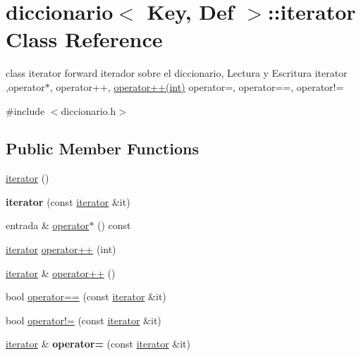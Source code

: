 \hypertarget{classdiccionario_1_1iterator}{\section{diccionario$<$ Key, Def $>$\-:\-:iterator Class Reference}
\label{classdiccionario_1_1iterator}
}


class iterator forward iterador sobre el diccionario, Lectura y Escritura iterator ,operator$\ast$, operator++, \hyperlink{classdiccionario_1_1iterator_a64f78428635fb5d522c3fb74c620a730}{operator++(int)} operator=, operator==, operator!=  




{\ttfamily \#include $<$diccionario.\-h$>$}

\subsection*{Public Member Functions}
\begin{DoxyCompactItemize}
\item 
\hyperlink{classdiccionario_1_1iterator_adee4d56d4dab49ac2447e756bfccb8bc}{iterator} ()
\item 
\hypertarget{classdiccionario_1_1iterator_aee562a07b03b74b21fb053fc1ef5e7d3}{{\bfseries iterator} (const \hyperlink{classdiccionario_1_1iterator}{iterator} \&it)}\label{classdiccionario_1_1iterator_aee562a07b03b74b21fb053fc1ef5e7d3}

\item 
entrada \& \hyperlink{classdiccionario_1_1iterator_a8da6c31c0d71de2858b866f8ba821046}{operator$\ast$} () const 
\item 
\hyperlink{classdiccionario_1_1iterator}{iterator} \hyperlink{classdiccionario_1_1iterator_a64f78428635fb5d522c3fb74c620a730}{operator++} (int)
\item 
\hyperlink{classdiccionario_1_1iterator}{iterator} \& \hyperlink{classdiccionario_1_1iterator_a94163f319041c0b014c60f93af51d14d}{operator++} ()
\item 
bool \hyperlink{classdiccionario_1_1iterator_a19ee50ed9600a52098814dbe7ad0cf33}{operator==} (const \hyperlink{classdiccionario_1_1iterator}{iterator} \&it)
\item 
bool \hyperlink{classdiccionario_1_1iterator_a6a6cf53a336bdec1a8ab55850d3b5a71}{operator!=} (const \hyperlink{classdiccionario_1_1iterator}{iterator} \&it)
\item 
\hypertarget{classdiccionario_1_1iterator_ae92cc5747c6b0807885de2b6f5053a59}{\hyperlink{classdiccionario_1_1iterator}{iterator} \& {\bfseries operator=} (const \hyperlink{classdiccionario_1_1iterator}{iterator} \&it)}\label{classdiccionario_1_1iterator_ae92cc5747c6b0807885de2b6f5053a59}

\end{DoxyCompactItemize}
